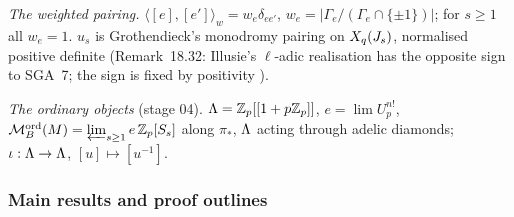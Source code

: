 \emph{The weighted pairing.} $\langle[e],[e']\rangle_w=w_e\delta_{ee'}$, $w_e=|\Gamma_e/(\Gamma_e\cap\{\pm1\})|$; for $s\ge1$ all $w_e=1$.
$u_s$ is Grothendieck's monodromy pairing on $X_q(J_s)$, normalised positive definite (Remark~18.32: Illusie's $\ell$-adic
realisation has the opposite sign to SGA~7; the sign is fixed by positivity \cite[Raynaud, Thm.~5, p.~17]{Ast196}).

\emph{The ordinary objects} (stage 04). $\Lambda=\mathbb{Z}_p[[1+p\mathbb{Z}_p]]$, $e=\lim U_p^{n!}$, $\mathcal{M}^{\mathrm{ord}}_B(M)=\varprojlim_{s\ge1}e\,\mathbb{Z}_p[S_s]$ along $\pi_*$,
$\Lambda$ acting through adelic diamonds; $\iota:\Lambda\to\Lambda$, $[u]\mapsto[u^{-1}]$.

\subsubsection*{Main results and proof outlines}

